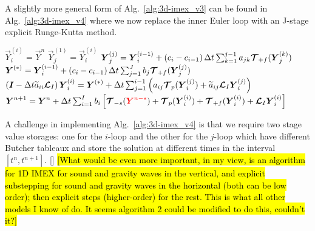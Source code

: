 \documentclass{report}
\begin{document}
{A slightly more general form of Alg.\ \ref{alg:3d-imex_v3} can be found in Alg.\ \ref{alg:3d-imex_v4} where we now replace the inner Euler loop with an J-stage explicit Runge-Kutta method. 
\begin{algorithm}
\label{alg:3d-imex_v4}
\begin{algorithmic}
\State
{}
\State $\vec{Y}_i^{(i)}=\vec{Y}^{n}$
\State $\vec{Y}_j^{(1)}=\vec{Y}_i^{(i)}$
\State $\boldsymbol{{Y}}_j^{(j)}=\boldsymbol{{Y}}_i^{(i-1)} + \left(c_i - c_{i-1} \right) \Delta t \sum_{k=1}^{j-1} a_{jk} \boldsymbol{{\mathcal{T}}}_{+f}(\boldsymbol{{Y}}_j^{(k)})$
\EndFor %
\State $\boldsymbol{{Y}}^{(*)}=\boldsymbol{{Y}}_i^{(i-1)} + \left(c_i - c_{i-1} \right) \Delta t \sum_{j=1}^{J} b_j \boldsymbol{{\mathcal{T}}}_{+f}(\boldsymbol{{Y}}_j^{(j)})$
\State $\left( \boldsymbol{{I}} - \Delta t \widetilde{a}_{ii} \boldsymbol{{\mathcal{L}}}_I \right) \boldsymbol{{Y}}_i^{(i)}=\boldsymbol{{Y}}^{(*)} + \Delta t \sum_{j=1}^{i-1} \left( a_{ij} \boldsymbol{{\mathcal{T}}}_{p}(\boldsymbol{{Y}}_i^{(j)}) + \widetilde{a}_{ij} \boldsymbol{{\mathcal{L}}}_I \boldsymbol{{Y}}_i^{(j)} \right)$
\EndFor %
\State $\boldsymbol{{Y}}^{n+1}=\boldsymbol{{Y}}^{n} + \Delta t \sum_{i=1}^{I} b_i \left[ \boldsymbol{{\mathcal{T}}}_{-s}(\textcolor{red}{\boldsymbol{{Y}}^{n-s}}) + \boldsymbol{{\mathcal{T}}}_{p}(\boldsymbol{{Y}}_i^{(i)}) + 
\boldsymbol{{\mathcal{T}}}_{+f}(\boldsymbol{{Y}}_i^{(i)}) + 
\boldsymbol{{\mathcal{L}}}_I \boldsymbol{{Y}}_i^{(i)} \right]$
\EndFunction
\end{algorithmic}
\end{algorithm}
A challenge in implementing Alg.\ \ref{alg:3d-imex_v4} is that we require two stage value storages: one for the $i$-loop and the other for the $j$-loop which have different Butcher tableaux and store the solution at different times in the interval $[t^n,t^{n+1}]$.
[]
\hl{[What would be even more important, in my view, is an algorithm for 1D IMEX for sound and gravity waves in the vertical, and explicit substepping for sound and gravity waves in the horizontal (both can be low order); then explicit steps (higher-order) for the rest. This is what all other models I know of do. It seems algorithm 2 could be modified to do this, couldn't it?]}

}
\end{document}
